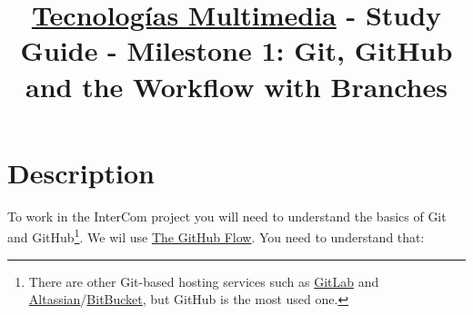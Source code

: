 \title{\href{https://www.ual.es/estudios/grados/presentacion/plandeestudios/asignatura/4015/40154321?idioma=zh_CN}{Tecnologías Multimedia} - Study Guide - Milestone 1: Git, GitHub and the Workflow with Branches}

\maketitle

\section{Description}

To work in the InterCom project \cite{intercom} you will need to
understand the basics of Git and GitHub\footnote{There are other
Git-based hosting services such as
\href{https://about.gitlab.com/}{GitLab} and
\href{https://www.atlassian.com/git}{Altassian}/\href{https://bitbucket.org/product}{BitBucket},
but GitHub is the most used one.}. We wil use
\href{https://guides.github.com/introduction/flow/index.html}{The
  GitHub Flow}. You need to understand that:

